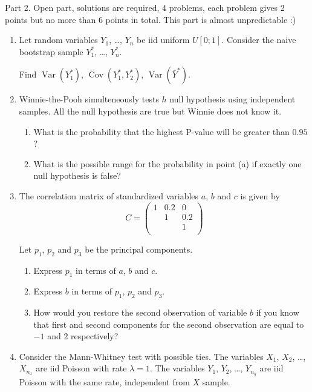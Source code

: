 \documentclass[11pt, a4paper]{article}
\DeclareMathOperator{\Var}{Var}
\DeclareMathOperator{\Cov}{Cov}
\theoremstyle{definition}
\begin{document}
Part 2. Open part, solutions are required, 4 problems, each problem gives 2 points but no more than 6 points in total.
This part is almost unpredictable :)

\begin{enumerate}
 \item Let random variables $Y_1$, \ldots, $Y_n$ be iid uniform $U[0;1]$.
    Consider the naive bootstrap sample $Y_1^*$, \ldots, $Y_n^*$.

    Find $\Var(Y_1^*)$, $\Cov(Y_1^*, Y_2^*)$, $\Var(\bar Y^*)$.

    \item Winnie-the-Pooh simulteneously tests $h$ null hypothesis using independent samples. 
    All the null hypothesis are true but Winnie does not know it. 
    
    \begin{enumerate}
        \item What is the probability that the highest P-value will be greater than $0.95$?
        \item What is the possible range for the probability in point (a) if exactly one null hypothesis is false?
    \end{enumerate}

    \item The correlation matrix of standardized variables $a$, $b$ and $c$ is given by
    \[
    C = \begin{pmatrix}
        1 & 0.2 & 0 \\
         & 1 &  0.2 \\
         & & 1 \\
    \end{pmatrix}
    \]

    Let $p_1$, $p_2$ and $p_3$ be the principal components. 

    \begin{enumerate}
        \item Express $p_1$ in terms of $a$, $b$ and $c$. 
        \item Express $b$ in terms of $p_1$, $p_2$ and $p_3$. 
        \item How would you restore the second observation of variable $b$ if you know that first and second 
        components for the second observation are equal to $-1$ and $2$ respectively?
    \end{enumerate}

    \item Consider the Mann-Whitney test with possible ties. 
    The variables $X_1$, $X_2$, \ldots, $X_{n_x}$ are iid Poisson with rate $\lambda =1$. 
    The variables $Y_1$, $Y_2$, \ldots, $Y_{n_y}$ are iid Poisson with the same rate, independent from $X$ sample. 


\end{enumerate}
\end{document}
